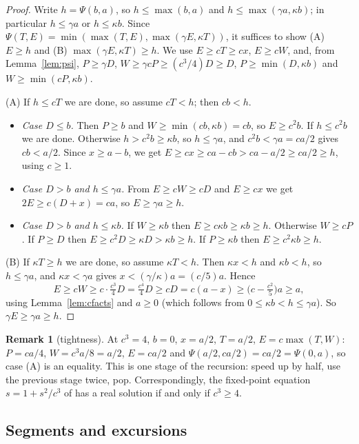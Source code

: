 \documentclass[11pt]{article}
\theoremstyle{definition}
\newtheorem{remark}[theorem]{Remark}
\begin{document}
\begin{proof}
Write $h=\Psi(b,a)$, so $h\le\max(b,a)$ and $h\le\max(\gamma a,\kappa b)$; in particular $h\le\gamma a$ or $h\le\kappa b$. Since $\Psi(T,E)=\min(\max(T,E),\max(\gamma E,\kappa T))$, it suffices to show (A) $E\ge h$ and (B) $\max(\gamma E,\kappa T)\ge h$. We use $E\ge cT\ge cx$, $E\ge cW$, and, from Lemma~\ref{lem:psi}, $P\ge\gamma D$, $W\ge\gamma cP\ge(c^3/4)D\ge D$, $P\ge\min(D,\kappa b)$ and $W\ge\min(cP,\kappa b)$.

(A) If $h\le cT$ we are done, so assume $cT<h$; then $cb<h$.
\begin{itemize}
\item \emph{Case $D\le b$.} Then $P\ge b$ and $W\ge\min(cb,\kappa b)=cb$, so $E\ge c^2b$. If $h\le c^2 b$ we are done. Otherwise $h>c^2b\ge\kappa b$, so $h\le\gamma a$, and $c^2b<\gamma a=ca/2$ gives $cb<a/2$. Since $x\ge a-b$, we get $E\ge cx\ge ca-cb>ca-a/2\ge ca/2\ge h$, using $c\ge1$.
\item \emph{Case $D>b$ and $h\le\gamma a$.} From $E\ge cW\ge cD$ and $E\ge cx$ we get $2E\ge c(D+x)=ca$, so $E\ge\gamma a\ge h$.
\item \emph{Case $D>b$ and $h\le\kappa b$.} If $W\ge\kappa b$ then $E\ge c\kappa b\ge\kappa b\ge h$. Otherwise $W\ge cP$. If $P\ge D$ then $E\ge c^2D\ge\kappa D>\kappa b\ge h$. If $P\ge\kappa b$ then $E\ge c^2\kappa b\ge h$.
\end{itemize}

(B) If $\kappa T\ge h$ we are done, so assume $\kappa T<h$. Then $\kappa x<h$ and $\kappa b<h$, so $h\le\gamma a$, and $\kappa x<\gamma a$ gives $x<(\gamma/\kappa)a=(c/5)a$. Hence
\[ E\ge cW\ge c\cdot\tfrac{c^3}{4}D=\tfrac{c^4}{4}D\ge cD=c(a-x)\ge\bigl(c-\tfrac{c^2}{5}\bigr)a\ge a, \]
using Lemma~\ref{lem:cfacts} and $a\ge0$ (which follows from $0\le\kappa b<h\le\gamma a$). So $\gamma E\ge\gamma a\ge h$.
\end{proof}

\begin{remark}[tightness]
At $c^3=4$, $b=0$, $x=a/2$, $T=a/2$, $E=c\max(T,W)$: $P=ca/4$, $W=c^3a/8=a/2$, $E=ca/2$ and $\Psi(a/2,ca/2)=ca/2=\Psi(0,a)$, so case (A) is an equality. This is one stage of the \cite{DvMW11} recursion: speed up by half, use the previous stage twice, pop. Correspondingly, the fixed-point equation $s=1+s^2/c^3$ of \cite[Claim~2]{W13} has a real solution if and only if $c^3\ge4$.
\end{remark}

\subsection{Segments and excursions}
\end{document}

